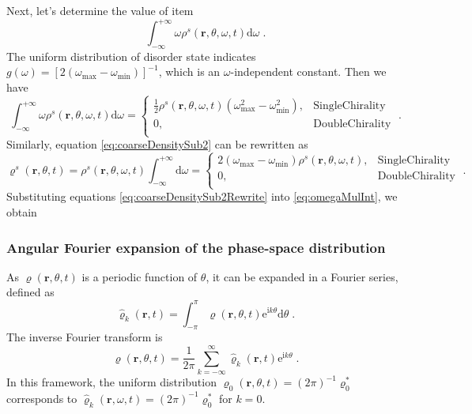 \documentclass{article}
\begin{document}
Next, let's determine the value of item
\begin{equation}
    \int_{-\infty}^{+\infty}{\omega \rho ^s\left( \mathbf{r},\theta ,\omega ,t \right) \text{d}\omega}\;.
\end{equation}
The uniform distribution of disorder state indicates $g\left( \omega \right) =\left[ 2\left( \omega _{\max}-\omega _{\min} \right) \right] ^{-1}$, which is an $\omega$-independent constant. Then we have
\begin{equation}
    \label{eq:omegaMulInt}
    \int_{-\infty}^{+\infty}{\omega \rho ^s\left( \mathbf{r},\theta ,\omega ,t \right) \text{d}\omega}=\begin{cases}
        \frac{1}{2}\rho ^s\left( \mathbf{r},\theta ,\omega ,t \right) \left( \omega _{\max}^{2}-\omega _{\min}^{2} \right) ,&		\text{Single} \text{Chirality}\\
        0,&		\text{Double} \text{Chirality}\\
    \end{cases}\;.
\end{equation}
Similarly, equation \eqref{eq:coarseDensitySub2} can be rewritten as
\begin{equation}
    \label{eq:coarseDensitySub2Rewrite}
    \varrho ^s\left( \mathbf{r},\theta ,t \right) =\rho ^s\left( \mathbf{r},\theta ,\omega ,t \right) \int_{-\infty}^{+\infty}{\text{d}\omega}=\begin{cases}
        2\left( \omega _{\max}-\omega _{\min} \right) \rho ^s\left( \mathbf{r},\theta ,\omega ,t \right) ,&		\text{Single} \text{Chirality}\\
        0,&		\text{Double} \text{Chirality}\\
    \end{cases}\;.
\end{equation}
Substituting equations \eqref{eq:coarseDensitySub2Rewrite} into \eqref{eq:omegaMulInt}, we obtain 

\subsubsection{Angular Fourier expansion of the phase-space distribution}
As $\varrho(\mathbf{r},\theta,t)$ is a periodic function of $\theta$, it can be expanded in a Fourier series, defined as
\begin{equation}
    \hat{\varrho}_k(\mathbf{r},t)=\int_{-\pi}^\pi \varrho(\mathbf{r},\theta,t) \mathrm{e}^{\mathrm{i}k\theta}\mathrm{d}\theta\;.
\end{equation}
The inverse Fourier transform is
\begin{equation}
    \label{eq:inverseFourier}
    \varrho (\mathbf{r},\theta ,t)=\frac{1}{2\pi}\sum_{k=-\infty}^{\infty}{\hat{\varrho}_k(\mathbf{r},t)\mathrm{e}^{\mathrm{i}k\theta}\;.}
\end{equation}
In this framework, the uniform distribution $\varrho _0(\mathbf{r},\theta ,t)=\left( 2\pi \right) ^{-1}\varrho _{0}^{*}$ corresponds to $\hat{\varrho}_k(\mathbf{r},\omega,t)=\left( 2\pi \right) ^{-1}\varrho _{0}^{*}$ for $k=0$.
\end{document}
